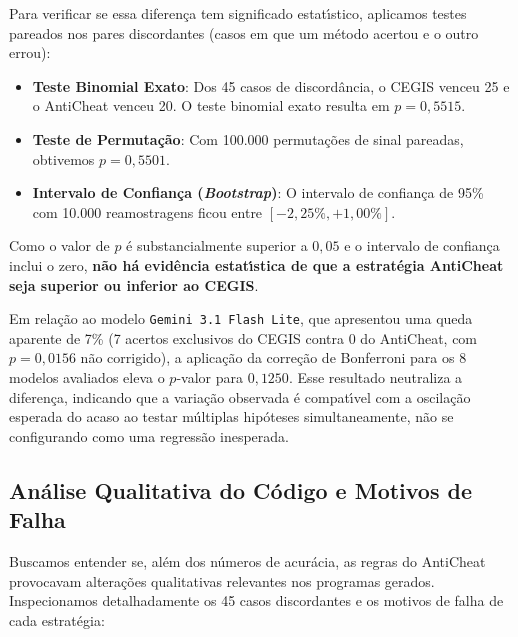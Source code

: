 Para verificar se essa diferen\c{c}a tem significado estat\'{\i}stico, aplicamos testes pareados nos pares discordantes (casos em que um m\'{e}todo acertou e o outro errou):
\begin{itemize}
    \item \textbf{Teste Binomial Exato}: Dos 45 casos de discord\^{a}ncia, o CEGIS venceu 25 e o AntiCheat venceu 20. O teste binomial exato resulta em $p = 0,5515$.
    \item \textbf{Teste de Permuta\c{c}\~{a}o}: Com 100.000 permuta\c{c}\~{o}es de sinal pareadas, obtivemos $p = 0,5501$.
    \item \textbf{Intervalo de Confian\c{c}a (\textit{Bootstrap})}: O intervalo de confian\c{c}a de 95\% com 10.000 reamostragens ficou entre $[-2,25\%, +1,00\%]$.
\end{itemize}

Como o valor de $p$ \'{e} substancialmente superior a $0,05$ e o intervalo de confian\c{c}a inclui o zero, \textbf{n\~{a}o h\'{a} evid\^{e}ncia estat\'{\i}stica de que a estrat\'{e}gia AntiCheat seja superior ou inferior ao CEGIS}.

Em rela\c{c}\~{a}o ao modelo \texttt{Gemini 3.1 Flash Lite}, que apresentou uma queda aparente de 7\% (7 acertos exclusivos do CEGIS contra 0 do AntiCheat, com $p = 0,0156$ n\~{a}o corrigido), a aplica\c{c}\~{a}o da corre\c{c}\~{a}o de Bonferroni para os 8 modelos avaliados eleva o $p$-valor para $0,1250$. Esse resultado neutraliza a diferen\c{c}a, indicando que a varia\c{c}\~{a}o observada \'{e} compat\'{\i}vel com a oscila\c{c}\~{a}o esperada do acaso ao testar m\'{u}ltiplas hip\'{o}teses simultaneamente, n\~{a}o se configurando como uma regress\~{a}o inesperada.

\subsection{An\'{a}lise Qualitativa do C\'{o}digo e Motivos de Falha}

Buscamos entender se, al\'{e}m dos n\'{u}meros de acur\'{a}cia, as regras do AntiCheat provocavam altera\c{c}\~{o}es qualitativas relevantes nos programas gerados. Inspecionamos detalhadamente os 45 casos discordantes e os motivos de falha de cada estrat\'{e}gia:

